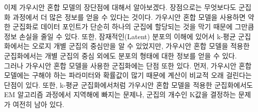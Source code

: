 \documentclass[a4paper]{oblivoir}
\begin{document}
이제 가우시안 혼합 모델의 장단점에 대해서 알아보겠다. 장점으로는 무엇보다도 군집화 과정에서 더 많은 정보를 얻을 수 있다는 것이다. 가우시안 혼합 모델을 사용하면 약한 군집화로 데이터 포인트가 단순히 하나의 군집에 할당되는 것을 막기 때문에 그만큼 정보 손실을 줄일 수 있다. 또한, 잠재적인(Latent) 분포의 이해에 있어서 k-평균 군집화에서는 오로지 개별 군집의 중심만을 알 수 있었지만, 가우시안 혼합 모델을 적용한 군집화에서는 개별 군집의 중심 외에도 분포의 형태에 대한 정보를 얻을 수 있다. \\

그러나 가우시안 혼합 모델을 사용한 군집화에는 단점 또한 있다. 먼저, 가우시안 혼합 모델에는 구해야 하는 파라미터와 확률값이 많기 때문에 계산이 비교적 오래 걸린다는 단점이 있다. 또한, k-평균 군집화에서처럼 가우시안 혼합 모델을 적용한 군집화에서도 EM 알고리즘 과정에서 지역해에 빠지는 문제나, 군집의 개수인 K값을 결정하는 문제가 여전히 남아 있다. \\
\end{document}
